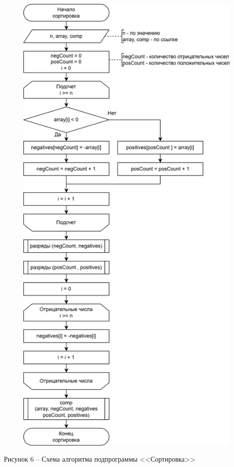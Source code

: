 \documentclass[a4paper,14pt]{extarticle}
\begin{document}
  \pagebreak
  \begin{figure}[h]
    \centering
    \includegraphics[width=0.55\linewidth]{images/s-2-2}
  \end{figure}
  \begin{center}
    Рисунок 6 – Схема алгоритма подпрограммы <<Сортировка>>
  \end{center}
\end{document}
